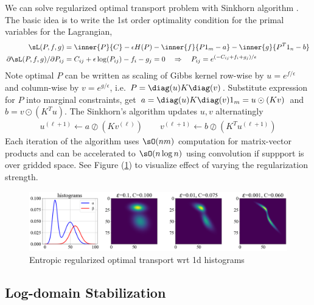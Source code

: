\documentclass[11pt]{article}
\begin{document}
We can solve regularized optimal transport problem with Sinkhorn algorithm \cite{cuturiSinkhornDistancesLightspeed2013}. The basic idea is to write the 1st order optimality condition for the primal variables for the Lagrangian,
\begin{align}
    \sL(P,f,g)
        &= \inner{P}{C} - \epsilon H(P) - \inner{f}{P1_m-a}- \inner{g}{P^T1_n-b} \\
    \partial \sL(P,f,g)/\partial P_{ij}
        &= C_{ij} + \epsilon \log(P_{ij}) - f_i - g_j = 0
        \quad\Rightarrow\quad
        P_{ij} = e^{(-C_{ij}+f_i+g_j)/\epsilon}
\end{align}
Note optimal $P$ can be written as scaling of Gibbs kernel row-wise by $u=e^{f/\epsilon}$ and column-wise by $v=e^{g/\epsilon}$, i.e. $P=\diag(u)K \diag(v)$. Substitute expression for $P$ into marginal constraints, get $a = \diag(u) K \diag(v) 1_m = u\odot (Kv)$ and $b = v\odot (K^T u)$. The Sinkhorn's algorithm updates $u,v$ alternatingly
\begin{align}
    u^{(\ell+1)} 
        \leftarrow a \oslash (Kv^{(\ell)}) 
    \quad\quad
    v^{(\ell+1)}
        \leftarrow b \oslash (K^Tu^{(\ell+1)})
\end{align}
Each iteration of the algorithm uses $\sO(nm)$ computation for matrix-vector products and can be accelerated to $\sO(n\log n)$ using convolution if suppport is over gridded space. See Figure (\ref{fig:plt_sinkhorn_vary_epsilon}) to visualize effect of varying the regularization strength.

\begin{center} 
\begin{figure}[h!]
    \includegraphics[width=\textwidth]{assets/plt_sinkhorn_vary_epsilon} 
    \caption{Entropic regularized optimal transport wrt 1d histograms}
    \label{fig:plt_sinkhorn_vary_epsilon}
\end{figure}
\end{center} 

\subsection{Log-domain Stabilization}
\end{document}
